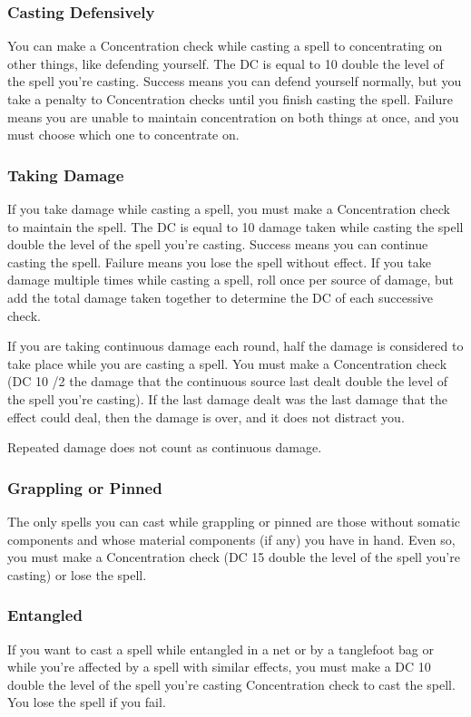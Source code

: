 \subsubsection{Casting Defensively}
You can make a Concentration check while casting a spell to concentrating on other things, like defending yourself. The DC is equal to 10 \add double the level of the spell you're casting. Success means you can defend yourself normally, but you take a  penalty to Concentration checks until you finish casting the spell. Failure means you are unable to maintain concentration on both things at once, and you must choose which one to concentrate on.

\subsubsection{Taking Damage}
If you take damage while casting a spell, you must make a Concentration check to maintain the spell. The DC is equal to 10 \add damage taken while casting the spell \add double the level of the spell you're casting. Success means you can continue casting the spell. Failure means you lose the spell without effect. If you take damage multiple times while casting a spell, roll once per source of damage, but add the total damage taken together to determine the DC of each successive check.

If you are taking continuous damage each round, half the damage is considered to take place while you are casting a spell. You must make a Concentration check (DC 10 /2 the damage that the continuous source last dealt \add double the level of the spell you're casting). If the last damage dealt was the last damage that the effect could deal, then the damage is over, and it does not distract you.

Repeated damage does not count as continuous damage.

\subsubsection{Grappling or Pinned}

The only spells you can cast while grappling or pinned are those without somatic components and whose material components (if any) you have in hand. Even so, you must make a Concentration check (DC 15 \add double the level of the spell you're casting) or lose the spell.

\subsubsection{Entangled}
If you want to cast a spell while entangled in a net or by a tanglefoot bag or while you're affected by a spell with similar effects, you must make a DC 10 \add double the level of the spell you're casting Concentration check to cast the spell. You lose the spell if you fail.

